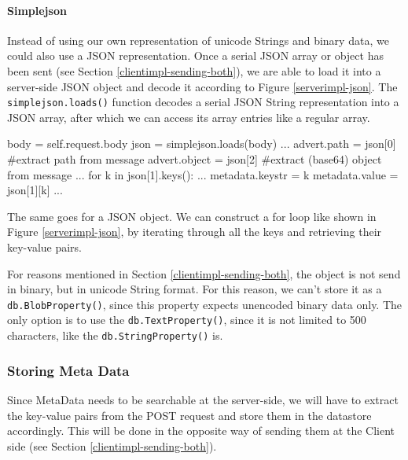 \paragraph{Simplejson}
\label{serverimpl-simplejson}
Instead of using our own representation of unicode Strings and binary data, we
could also use a JSON representation. Once a serial JSON array or object has
been sent (see Section \ref{clientimpl-sending-both}), we are able to load it
into a server-side JSON object and decode it according to Figure
\ref{serverimpl-json}. The \texttt{simplejson.loads()} function decodes a
serial JSON String representation into a JSON array, after which we can access
its array entries like a regular array. 

\begin{figure*}[ht] %
\begin{center}
\begin{code}
body = self.request.body
json = simplejson.loads(body)
...
advert.path   = json[0] #extract path from message
advert.object = json[2] #extract (base64) object from message
...
for k in json[1].keys():
  ...
  metadata.keystr = k
  metadata.value  = json[1][k]
...
\end{code}
\caption{Decoding a JSON object.\label{serverimpl-json}}
\end{center}
\end{figure*}

The same goes for a JSON object. We can construct a for loop like shown in
Figure \ref{serverimpl-json}, by iterating through all the keys and retrieving
their key-value pairs.

For reasons mentioned in Section \ref{clientimpl-sending-both}, the object is
not send in binary, but in unicode String format. For this reason, we can't
store it as a \texttt{db.BlobProperty()}, since this property expects unencoded
binary data only. The only option is to use the \texttt{db.TextProperty()},
since it is not limited to 500 characters, like the \texttt{db.StringProperty()}
is.

\subsubsection{Storing Meta Data}
Since MetaData needs to be searchable at the server-side, we will have to extract
the key-value pairs from the POST request and store them in the datastore
accordingly. This will be done in the opposite way of sending them at the Client
side (see Section \ref{clientimpl-sending-both}).

